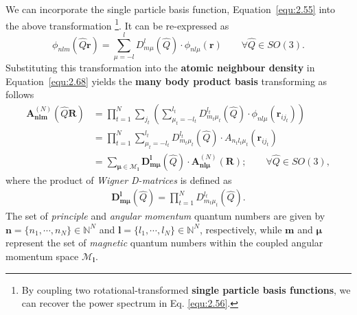 We can incorporate the single particle basis function, Equation~\eqref{equ:2.55} into the above transformation \footnote{By coupling two rotational-transformed \textbf{single particle basis functions}, we can recover the power spectrum in Eq. \eqref{equ:2.56}.}.
It can be re-expressed as
\begin{equation}
\label{equ:2.72}
\phi_{nlm}(\hat{Q}\textbf{r})
= \sum^{l}_{\mu=-l}
D^{l}_{m\mu}(\hat{Q})\cdot
\phi_{nl\mu}(\textbf{r})
\quad\quad\forall\hat{Q} \in SO(3).
\end{equation}
Substituting this transformation into the \textbf{atomic neighbour density} in Equation~\eqref{equ:2.68} yields the \textbf{many body product basis} transforming as follows
\begin{equation}
\label{equ:2.73}
\begin{split}
\textbf{A}^{(N)}_{\mathbf{nlm}}(\hat{Q}\mathbf{R})&=
\prod_{t=1}^{N}
\sum_{j_{t}}
\left(
\sum^{l_{t}}_{\mu_{t}=-l_{t}}
D^{l_{t}}_{m_{t}\mu_{t}}(\hat{Q})\cdot
\phi_{nl\mu}(\textbf{r}_{ij_{t}})
\right)
\\ &
=\prod_{t=1}^{N}
\sum^{l_{t}}_{\mu_{t}=-l_{t}}
D^{l_{t}}_{m_{t}\mu_{t}}(\hat{Q})\cdot
A_{n_{t}l_{t}\mu_{t}}(\mathbf{r}_{ij_{t}})
\\ &
=\sum_{\boldsymbol{\mu}\in\mathcal{M}_{\textbf{l}}}
\mathbf{D}^{\textbf{l}}_{\textbf{m}\boldsymbol{\mu}}(\hat{Q})\cdot
\textbf{A}^{(N)}_{\mathbf{nl}\boldsymbol{\mu}}(\mathbf{R});
\quad\quad\forall\hat{Q} \in SO(3),
\end{split}
\end{equation}
where the product of \textit{Wigner D-matrices} is defined as
\begin{equation}
\label{equ:2.74}
\begin{split}
\mathbf{D}^{\textbf{l}}_{\textbf{m}\boldsymbol{\mu}}(\hat{Q}) = \prod_{t=1}^{N}D^{l_{t}}_{m_{t}\mu_{t}}(\hat{Q}).
\end{split}
\end{equation}
The set of \textit{principle} and \textit{angular momentum} quantum numbers are given by
$\mathbf{n}=\{{n}_{1},\cdots,{n}_{N}\}\in\mathbb{N}^{N}$ and $\mathbf{l}=\{{l}_{1},\cdots,{l}_{N}\}\in\mathbb{N}^{N}$, respectively,
while $\mathbf{m}$ and $\boldsymbol{\mu}$ represent the set of \textit{magnetic} quantum numbers within the coupled angular momentum space $\mathcal{M}_{\textbf{l}}$.

